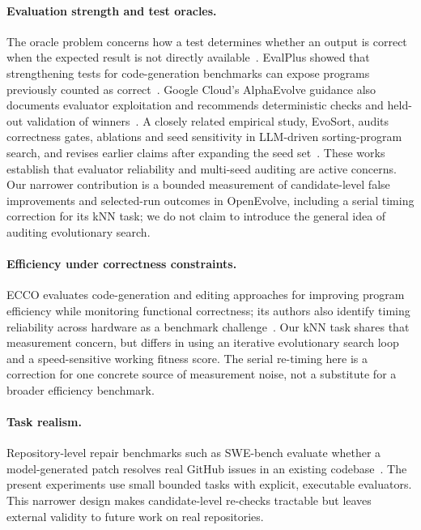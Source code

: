 \documentclass[11pt]{article}
\begin{document}
\paragraph{Evaluation strength and test oracles.} The oracle problem concerns how a test determines whether an output is correct when the expected result is not directly available~\citep{barr2015oracle}. EvalPlus showed that strengthening tests for code-generation benchmarks can expose programs previously counted as correct~\citep{liu2023evalplus}. Google Cloud's AlphaEvolve guidance also documents evaluator exploitation and recommends deterministic checks and held-out validation of winners~\citep{googlecloud2026rewardhacking}. A closely related empirical study, EvoSort, audits correctness gates, ablations and seed sensitivity in LLM-driven sorting-program search, and revises earlier claims after expanding the seed set~\citep{khudhair2026evosort}. These works establish that evaluator reliability and multi-seed auditing are active concerns. Our narrower contribution is a bounded measurement of candidate-level false improvements and selected-run outcomes in OpenEvolve, including a serial timing correction for its kNN task; we do not claim to introduce the general idea of auditing evolutionary search.

\paragraph{Efficiency under correctness constraints.} ECCO evaluates code-generation and editing approaches for improving program efficiency while monitoring functional correctness; its authors also identify timing reliability across hardware as a benchmark challenge~\citep{waghjale2024ecco}. Our kNN task shares that measurement concern, but differs in using an iterative evolutionary search loop and a speed-sensitive working fitness score. The serial re-timing here is a correction for one concrete source of measurement noise, not a substitute for a broader efficiency benchmark.

\paragraph{Task realism.} Repository-level repair benchmarks such as SWE-bench evaluate whether a model-generated patch resolves real GitHub issues in an existing codebase~\citep{jimenez2024swebench}. The present experiments use small bounded tasks with explicit, executable evaluators. This narrower design makes candidate-level re-checks tractable but leaves external validity to future work on real repositories.
\end{document}
